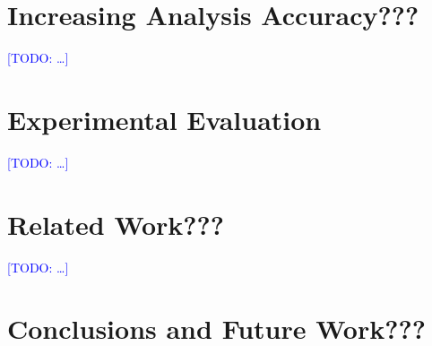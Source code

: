 \documentclass[runningheads]{llncs}
\newcommand{\todo}[1]{\textcolor{blue}{[TODO: #1]}}
\begin{document}

\section{Increasing Analysis Accuracy???}

\todo{\ldots}

\section{Experimental Evaluation}

\todo{\ldots}

\section{Related Work???}

\todo{\ldots}

\section{Conclusions and Future Work???}
\end{document}
